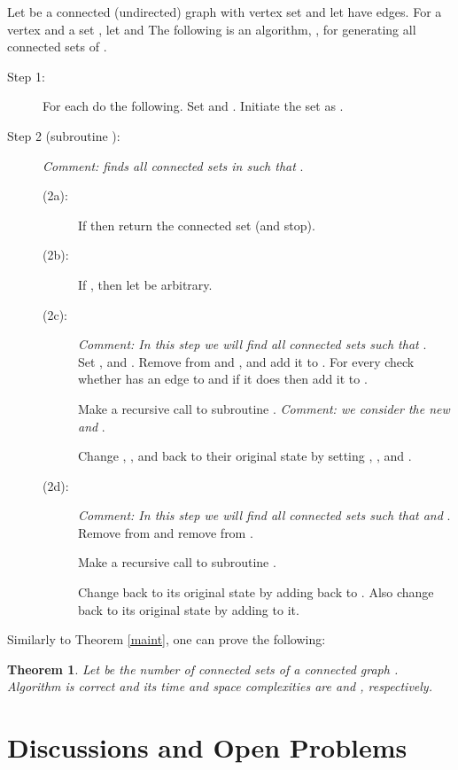 \documentclass[11pt]{article}
\newcommand{\2}{\vspace{0.2 cm}}
\newtheorem{theorem}{Theorem}[section]
\begin{document}
Let  be a connected (undirected) graph with vertex set
 and let  have  edges. For a
vertex  and a set , let  and  The
following is an algorithm, , for generating all connected
sets of .

\begin{description}
\item[Step 1:]
For each  do the following.  Set  and
. Initiate the set  as
.

\item[Step 2 (subroutine ):]
{\em Comment:  finds all connected sets  in  such that
}.

\begin{description}
\item[(2a):] If  then return the connected set  (and stop).

\item[(2b):] If , then let  be arbitrary.

\item[(2c):]  {\em Comment: In this step we will find all connected sets 
such that }.\\
Set
,  and . Remove  from  and
, and add it to . For every  check
whether  has an edge to  and if it does then add it to .

\2 Make a recursive call to subroutine . {\em Comment: we
consider the new  and }.

\2 Change , , and  back to their original state by
setting , , and .

\item[(2d):] {\em Comment: In this step we will find all connected
sets   such that  and }. Remove  from  and remove  from .

\2

Make a recursive call to subroutine .

\2

Change  back to its original state by adding  back to .
Also change  back to its original state by adding  to it.
\end{description}
\end{description}

Similarly to Theorem \ref{maint}, one can prove the following:

\begin{theorem}
Let  be the number of connected sets of a connected graph .
Algorithm  is correct and its time and space complexities
are  and , respectively.
\end{theorem}



\section{Discussions and Open Problems}\label{discsec}
\end{document}
